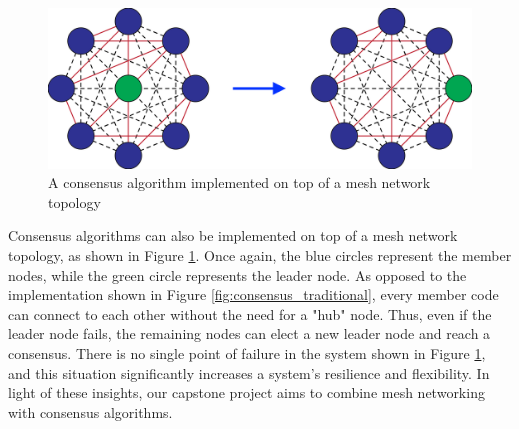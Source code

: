 \begin{figure}[H]
    \centering
    \includegraphics[width=0.6\columnwidth]{images/consensus_mesh.png}
    \caption{A consensus algorithm implemented on top of a mesh network topology}
    \label{fig:consensus_mesh}
\end{figure}

Consensus algorithms can also be implemented on top of a mesh network topology, as shown in Figure \ref{fig:consensus_mesh}. Once again, the blue circles represent the member nodes, while the green circle represents the leader node. As opposed to the implementation shown in Figure \ref{fig:consensus_traditional}, every member code can connect to each other without the need for a "hub" node. Thus, even if the leader node fails, the remaining nodes can elect a new leader node and reach a consensus. There is no single point of failure in the system shown in Figure \ref{fig:consensus_mesh}, and this situation significantly increases a system's resilience and flexibility. In light of these insights, our capstone project aims to combine mesh networking with consensus algorithms.